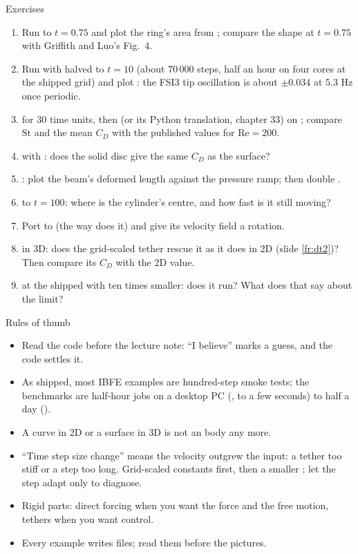 \documentclass[aspectratio=169,11pt]{beamer}
\begin{document}
\begin{frame}{Exercises}
\label{fr:exercises}
\footnotesize
\begin{enumerate}
  \item Run  to $t = 0.75$ and plot the ring's area from ; compare the shape at $t = 0.75$ with Griffith and Luo's Fig.\ 4.
  \item Run  with  halved to $t = 10$ (about $70\,000$ steps, half an hour on four cores at the shipped grid) and plot : the FSI3 tip oscillation is about $\pm0.034$ at $5.3$ Hz once periodic.
  \item {} for $30$ time units, then  (or its Python translation, chapter 33) on ; compare $\mathrm{St}$ and the mean $C_D$ with the published values for $\mathrm{Re} = 200$.
  \item {} with : does the solid disc give the same $C_D$ as the surface?
  \item {}: plot the beam's deformed length against the pressure ramp; then double .
  \item {} to $t = 100$: where is the cylinder's centre, and how fast is it still moving?
  \item Port  to  (the way  does it) and give its velocity field a rotation.
  \item {} in 3D: does the grid-scaled tether rescue it as it does in 2D (slide \ref{fr:dt2})? Then compare its $C_D$ with the 2D value.
  \item {} at the shipped  with  ten times smaller: does it run? What does that say about the limit?
\end{enumerate}
\end{frame}

\begin{frame}{Rules of thumb}
\label{fr:thumb}
\small
\begin{itemize}
  \item Read the code before the lecture note: ``I believe'' marks a guess, and the code settles it.
  \item As shipped, most IBFE examples are hundred-step smoke tests; the benchmarks are half-hour jobs on a desktop PC (,  to a few seconds) to half a day ().
  \item A curve in 2D or a surface in 3D is not an  body any more.
  \item ``Time step size change'' means the velocity outgrew the input: a tether too stiff or a step too long. Grid-scaled constants first, then a smaller ; let the step adapt only to diagnose.
  \item Rigid parts: direct forcing when you want the force and the free motion, tethers when you want control.
  \item Every example writes  files; read them before the pictures.
\end{itemize}
\end{frame}
\end{document}
